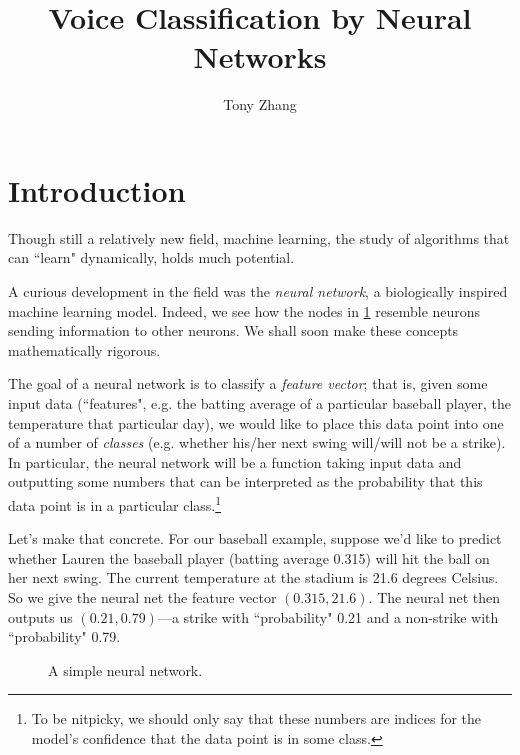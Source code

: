\documentclass{article}
\title{Voice Classification by Neural Networks}
\author{Tony Zhang}
\begin{document}
\maketitle

\begin{abstract}
\end{abstract}

\section{Introduction}


Though still a relatively new field, machine learning, the study of algorithms that can ``learn" dynamically, holds much potential. 

A curious development in the field was the \emph{neural network}, a biologically inspired machine learning model. Indeed, we see how the nodes in \cref{fig:neuralnet} resemble neurons sending information to other neurons. We shall soon make these concepts mathematically rigorous.

The goal of a neural network is to classify a \emph{feature vector}; that is, given some input data (``features", e.g. the batting average of a particular baseball player, the temperature that particular day), we would like to place this data point into one of a number of \emph{classes} (e.g. whether his/her next swing will/will not be a strike). In particular, the neural network will be a function taking input data and outputting some numbers that can be interpreted as the probability that this data point is in a particular class.\footnote{To be nitpicky, we should only say that these numbers are indices for the model's confidence that the data point is in some class.}

Let's make that concrete. For our baseball example, suppose we'd like to predict whether Lauren the baseball player (batting average 0.315) will hit the ball on her next swing. The current temperature at the stadium is 21.6 degrees Celsius. So we give the neural net the feature vector $(0.315, 21.6)$. The neural net then outputs us $(0.21, 0.79)$---a strike with ``probability" 0.21 and a non-strike with ``probability" 0.79.

\begin{figure}[htbp]
\centering

\caption{A simple neural network.}
\label{fig:neuralnet}
\end{figure}
\end{document}
